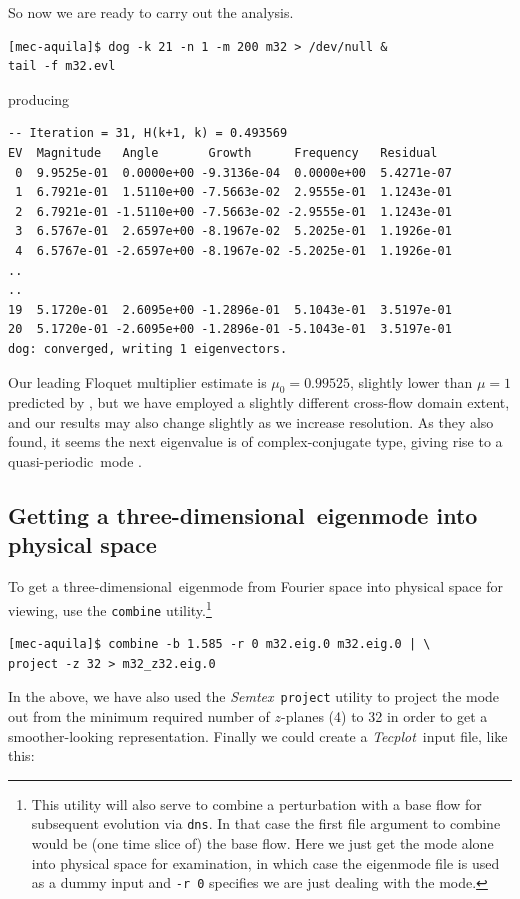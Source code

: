\documentclass[11pt,a4paper]{report}
\newcommand\qp{qua\-si-per\-io\-dic}
\newcommand\threed{three-di\-men\-sion\-al}
\newcommand{\Semtex}{\emph{Semtex}}
\newcommand{\Tecplot}{\emph{Tecplot}}
\begin{document}
So now we are ready to carry out the analysis.
\begin{verbatim}
[mec-aquila]$ dog -k 21 -n 1 -m 200 m32 > /dev/null &
tail -f m32.evl
\end{verbatim}
\noindent producing
{\small
\begin{verbatim}
-- Iteration = 31, H(k+1, k) = 0.493569
EV  Magnitude   Angle       Growth      Frequency   Residual
 0  9.9525e-01  0.0000e+00 -9.3136e-04  0.0000e+00  5.4271e-07
 1  6.7921e-01  1.5110e+00 -7.5663e-02  2.9555e-01  1.1243e-01
 2  6.7921e-01 -1.5110e+00 -7.5663e-02 -2.9555e-01  1.1243e-01
 3  6.5767e-01  2.6597e+00 -8.1967e-02  5.2025e-01  1.1926e-01
 4  6.5767e-01 -2.6597e+00 -8.1967e-02 -5.2025e-01  1.1926e-01
..
..
19  5.1720e-01  2.6095e+00 -1.2896e-01  5.1043e-01  3.5197e-01
20  5.1720e-01 -2.6095e+00 -1.2896e-01 -5.1043e-01  3.5197e-01
dog: converged, writing 1 eigenvectors.
\end{verbatim}
}
\noindent
Our leading Floquet multiplier estimate is $\mu_0=0.99525$, slightly
lower than $\mu=1$ predicted by \cite{bah96}, but we have employed a
slightly different cross-flow domain extent, and our results may also
change slightly as we increase resolution. As they also found, it
seems the next eigenvalue is of complex-conjugate type, giving rise to
a \qp\ mode \citep{bllo03b}.


\subsection{Getting a \threed\ eigenmode into physical space}

To get a \threed\ eigenmode from Fourier space into physical space
for viewing, use the \verb|combine| utility.\footnote{
This utility will also serve to combine a perturbation with a base
flow for subsequent evolution via \texttt{dns}.  In that case the first
file argument to combine would be (one time slice of) the base
flow. Here we just get the mode alone into physical space for
examination, in which case the eigenmode file is used as a dummy input
and \texttt{-r 0} specifies we are just dealing with the mode.}

\begin{verbatim}
[mec-aquila]$ combine -b 1.585 -r 0 m32.eig.0 m32.eig.0 | \
project -z 32 > m32_z32.eig.0
\end{verbatim}

In the above, we have also used the \Semtex\ \verb+project+ utility to
project the mode out from the minimum required number of $z$-planes
(4) to 32 in order to get a smoother-looking representation.  Finally
we could create a \Tecplot\ input file, like this:
\end{document}
